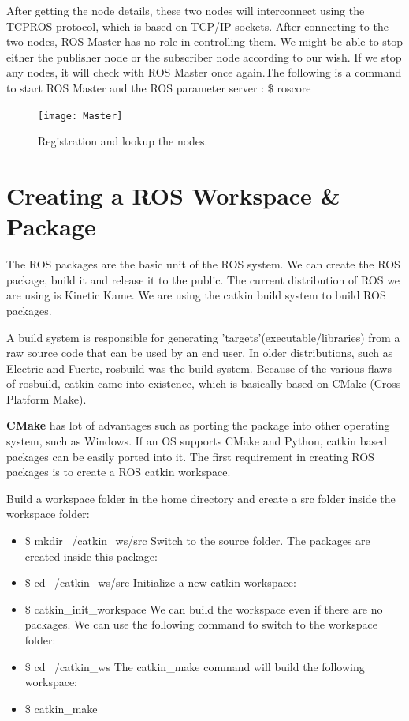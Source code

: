 	 After getting the node details, these two nodes will interconnect using the TCPROS protocol, which is based on TCP/IP sockets. After connecting to the two nodes, ROS Master has no role in controlling them. We might be able to stop either the publisher node or the subscriber node according to our wish. If we stop any nodes, it will check with ROS Master once again.The following is a command to start ROS Master and the ROS parameter server : \$ roscore
	 
	 \begin{figure}[h]		
	 	\centering
	 	\texttt{[image: Master]}
	 	\caption{Registration and lookup the nodes.}
	 	\label{Fig:Master}
	 \end{figure}
 
\section{Creating a ROS Workspace \& Package}
 The ROS packages are the basic unit of the ROS system. We can create the ROS package, build it and release it to the public. The current distribution of ROS we are using is Kinetic Kame. We are using the catkin build system to build ROS packages.
 
 A build system is responsible for generating 'targets'(executable/libraries) from a raw source code that can be used by an end user. In older distributions, such as Electric and Fuerte, rosbuild was the build system. Because of the various flaws of rosbuild, catkin came into existence, which is basically based on CMake (Cross Platform Make).
 
 \textbf{CMake} has lot of advantages such as porting the package into other operating system, such as Windows. If an OS supports CMake and Python, catkin based packages can be easily ported into it. The first requirement in creating ROS packages is to create a ROS catkin workspace.
 
 Build a workspace folder in the home directory and create a src folder inside the workspace folder:
 \begin{itemize}
 	\item \$ mkdir ~/catkin\_ws/src
 	Switch to the source folder. The packages are created inside this package:
 	\item \$ cd ~/catkin\_ws/src
 	Initialize a new catkin workspace:
 	\item \$ catkin\_init\_workspace
	We can build the workspace even if there are no packages. We can use the following command to switch to the workspace folder:
 	\item \$ cd ~/catkin\_ws
 	The catkin\_make command will build the following workspace:
 	\item \$ catkin\_make
 \end{itemize}

